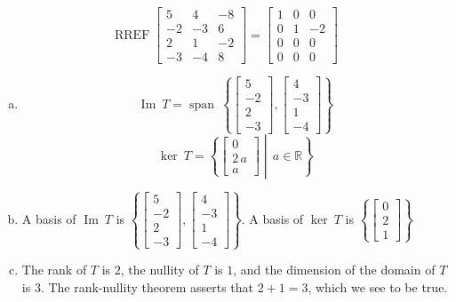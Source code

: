 \begin{exerciseAnswer} 


\[\operatorname{RREF} \left[\begin{array}{ccc}
5 & 4 & -8 \\
-2 & -3 & 6 \\
2 & 1 & -2 \\
-3 & -4 & 8
\end{array}\right] = \left[\begin{array}{ccc}
1 & 0 & 0 \\
0 & 1 & -2 \\
0 & 0 & 0 \\
0 & 0 & 0
\end{array}\right] \]


\begin{enumerate}[(a)]
\item \[\operatorname{Im}\ T = \operatorname{span}\  \left\{ \left[\begin{array}{c}
5 \\
-2 \\
2 \\
-3
\end{array}\right] , \left[\begin{array}{c}
4 \\
-3 \\
1 \\
-4
\end{array}\right] \right\} \]\[\operatorname{ker}\ T =  \left\{ \left[\begin{array}{c}
0 \\
2 \, a \\
a
\end{array}\right] \middle|\,a\in\mathbb{R}\right\} \]
\item  A basis of \(\operatorname{Im}\ T\) is \( \left\{ \left[\begin{array}{c}
5 \\
-2 \\
2 \\
-3
\end{array}\right] , \left[\begin{array}{c}
4 \\
-3 \\
1 \\
-4
\end{array}\right] \right\} \). A basis of \(\operatorname{ker}\ T\) is \( \left\{ \left[\begin{array}{c}
0 \\
2 \\
1
\end{array}\right] \right\} \)
\item  The rank of \(T\) is \( 2 \), the nullity of \(T\) is \( 1 \), and the dimension of the domain of \(T\) is \( 3 \). The rank-nullity theorem asserts that \( 2 + 1 = 3 \), which we see to be true. 
\end{enumerate}
    
\end{exerciseAnswer}
    
